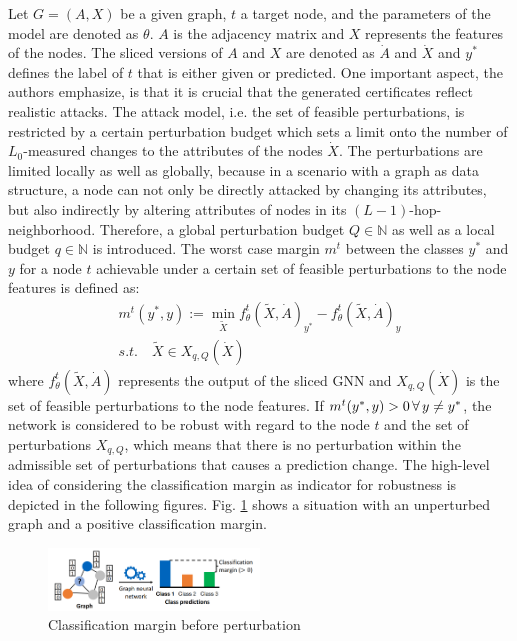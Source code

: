 \documentclass[a4paper,preprint]{sig-alternate}
\begin{document}
Let $G = (A, X)$ be a given graph, $t$ a target node, and the parameters of the model are denoted as $\theta$.
$A$ is the adjacency matrix and $X$ represents the features of the nodes. The sliced versions of $A$ and $X$ are denoted 
as $\dot{A}$ and $\dot{X}$ and $y^*$ defines the label of $t$ that is either given or predicted.
One important aspect, the authors emphasize, is that it is crucial that the generated certificates reflect realistic attacks.
The attack model, i.e. the set of feasible perturbations, is restricted by a certain perturbation budget which sets a limit 
onto the number of $L_0$-measured changes to the attributes of the nodes $\dot{X}$.
The perturbations are limited locally as well as globally, because in a scenario with a graph as data structure, a node can not 
only be directly attacked by changing its attributes, but also indirectly by altering attributes of nodes in its 
$(L-1)$-hop-neighborhood. \cite{Zuegner_2019}
Therefore, a global perturbation budget $Q \in \mathbb{N}$ as well as a local budget $q \in \mathbb{N}$ is introduced.
The worst case margin $m^t$ between the classes $y^*$ and $y$ for a node $t$ achievable under a certain set
of feasible perturbations to the node features is defined as:
\begin{gather} 
\label{eq:1}
    m^t (y^*, y) := \min_{\tilde{X}} f_{\theta}^t(\tilde{X}, \dot{A})_{y^*} - f_{\theta}^t(\tilde{X}, \dot{A})_y \\
    s.t. \quad \tilde{X} \in X_{q, Q} (\dot{X}) \nonumber
\end{gather}
where $f_{\theta}^t(\tilde{X}, \dot{A})$ represents the output of the sliced GNN and $X_{q, Q} (\dot{X})$ is the set
of feasible perturbations to the node features.
If $m^t (y^*, y) > 0 \thinspace \forall \thinspace y \neq y^*$, the network is considered to be robust with regard to the node $t$ and the set of
perturbations $X_{q, Q}$, which means that there is no perturbation within the admissible set of perturbations that causes a prediction change. \cite{Zuegner_2019}
The high-level idea of considering the classification margin as indicator for robustness is depicted in the following figures.
Fig. \ref{fig:before_pert} shows a situation with an unperturbed graph and a positive classification margin.

\begin{figure}[h]
    \centering
    \includegraphics[width=0.5\textwidth]{img/before_pert.png}
    \caption{Classification margin before perturbation \cite{Zuegner_2019}}
    \label{fig:before_pert}
\end{figure}
\end{document}
